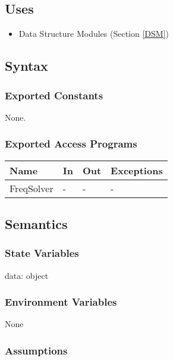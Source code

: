 \documentclass[12pt, titlepage]{article}
\begin{document}
	
	\subsection{Uses} \begin{itemize} \item Data Structure Modules (Section
		\ref{DSM}) \end{itemize}
	
	\subsection{Syntax}
	
	\subsubsection{Exported Constants} None. \subsubsection{Exported Access
		Programs}
	
	\begin{center} \begin{tabular}{p{2cm} p{4cm} p{4cm} p{2cm}} \hline \textbf{Name}
			& \textbf{In} & \textbf{Out} & \textbf{Exceptions} \\ \hline FreqSolver & - & -
			& - \\ \hline \end{tabular} \end{center}
	
	\subsection{Semantics}
	
	\subsubsection{State Variables}
	
	data: object
	
	\subsubsection{Environment Variables}
	
	None
	
	\subsubsection{Assumptions}
	
\end{document}
